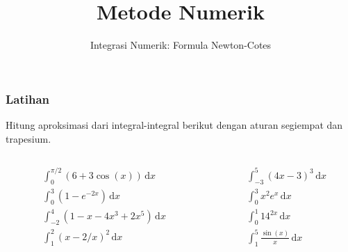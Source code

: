 



\title{Metode Numerik}
\subtitle{Integrasi Numerik: Formula Newton-Cotes}
\date{}


\frame{\titlepage}






\begin{frame}
\frametitle{Latihan}

Hitung aproksimasi dari integral-integral berikut dengan aturan segiempat dan trapesium.

\begin{columns}

\begin{column}{0.5\textwidth}
\begin{align*}
& \int_{0}^{\pi/2} (6 + 3\cos(x)) \, \mathrm{d}x \\
& \int_{0}^{3} (1 - e^{-2x}) \, \mathrm{d}x \\
& \int_{-2}^{4} (1 - x - 4x^3 + 2x^5) \, \mathrm{d}x \\
& \int_{1}^{2} (x - 2/x)^2 \, \mathrm{d}x
\end{align*}      
\end{column}

\begin{column}{0.5\textwidth}
\begin{align*}
& \int_{-3}^{5} (4x - 3)^3 \, \mathrm{d}x \\
& \int_{0}^{3} x^2 e^x \, \mathrm{d}x \\
& \int_{0}^{1} 14^{2x} \, \mathrm{d}x \\
& \int_{1}^{5} \frac{\sin(x)}{x}\,\mathrm{d}x
\end{align*}
\end{column}

\end{columns}

\end{frame}



